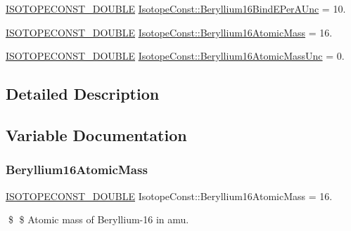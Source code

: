\begin{DoxyCompactItemize}
\mbox{\hyperlink{group___isotope_const-_macros_ga8f45a7272ce02c0b4c65c44636ed719a}{I\+S\+O\+T\+O\+P\+E\+C\+O\+N\+S\+T\+\_\+\+D\+O\+U\+B\+LE}} \mbox{\hyperlink{group___isotope_const-_beryllium-_be16_gac704487d5ccb77228f8fec2946b4e3d3}{Isotope\+Const\+::\+Beryllium16\+Bind\+E\+Per\+A\+Unc}} = 10.
\item 
\mbox{\hyperlink{group___isotope_const-_macros_ga8f45a7272ce02c0b4c65c44636ed719a}{I\+S\+O\+T\+O\+P\+E\+C\+O\+N\+S\+T\+\_\+\+D\+O\+U\+B\+LE}} \mbox{\hyperlink{group___isotope_const-_beryllium-_be16_ga9790d4e3bc944052b10a5cafe40387b6}{Isotope\+Const\+::\+Beryllium16\+Atomic\+Mass}} = 16.
\item 
\mbox{\hyperlink{group___isotope_const-_macros_ga8f45a7272ce02c0b4c65c44636ed719a}{I\+S\+O\+T\+O\+P\+E\+C\+O\+N\+S\+T\+\_\+\+D\+O\+U\+B\+LE}} \mbox{\hyperlink{group___isotope_const-_beryllium-_be16_ga00f9d1528b4b2759a34859736675cf4b}{Isotope\+Const\+::\+Beryllium16\+Atomic\+Mass\+Unc}} = 0.
\end{DoxyCompactItemize}


\subsection{Detailed Description}


\subsection{Variable Documentation}
\mbox{\label{group___isotope_const-_beryllium-_be16_ga9790d4e3bc944052b10a5cafe40387b6}} 
\subsubsection{\texorpdfstring{Beryllium16\+Atomic\+Mass}{Beryllium16AtomicMass}}
{\footnotesize\ttfamily \mbox{\hyperlink{group___isotope_const-_macros_ga8f45a7272ce02c0b4c65c44636ed719a}{I\+S\+O\+T\+O\+P\+E\+C\+O\+N\+S\+T\+\_\+\+D\+O\+U\+B\+LE}} Isotope\+Const\+::\+Beryllium16\+Atomic\+Mass = 16.}

\$ \$ Atomic mass of Beryllium-\/16 in amu. \mbox{\label{group___isotope_const-_beryllium-_be16_ga00f9d1528b4b2759a34859736675cf4b}} 
